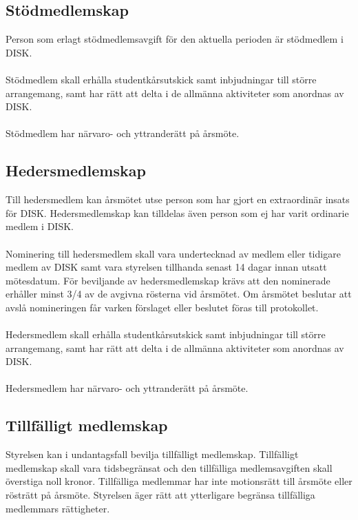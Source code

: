 	\subsection{Stödmedlemskap}
	\label{subsec:stodmedlemskap}
		Person som erlagt stödmedlemsavgift för den aktuella perioden är stödmedlem i DISK.\\ \\
		Stödmedlem skall erhålla studentkårsutskick samt inbjudningar till större arrangemang, samt har rätt att delta i de allmänna aktiviteter som anordnas av DISK.\\ \\
		Stödmedlem har närvaro- och yttranderätt på årsmöte.
\vfill
	\subsection{Hedersmedlemskap}
	\label{subsec:hedersmedlemskap}
		Till hedersmedlem kan årsmötet utse person som har gjort en extraordinär insats för DISK. Hedersmedlemskap kan tilldelas även person som ej har varit ordinarie medlem i DISK.\\ \\
Nominering till hedersmedlem skall vara undertecknad av medlem eller tidigare medlem av DISK samt vara styrelsen tillhanda senast 14 dagar innan utsatt mötesdatum. För beviljande av hedersmedlemskap krävs att den nominerade erhåller minst 3/4 av de avgivna rösterna vid årsmötet. Om årsmötet beslutar att avslå nomineringen får varken förslaget eller beslutet föras till protokollet.\\ \\
		Hedersmedlem skall erhålla studentkårsutskick samt inbjudningar till större arrangemang, samt har rätt att delta i de allmänna aktiviteter som anordnas av DISK.\\ \\
		Hedersmedlem har närvaro- och yttranderätt på årsmöte.

	\subsection{Tillfälligt medlemskap}
	\label{subsec:tillfalligtmedlemskap}
		Styrelsen kan i undantagsfall bevilja tillfälligt medlemskap. Tillfälligt medlemskap skall vara tidsbegränsat och den tillfälliga medlemsavgiften skall överstiga noll kronor. Tillfälliga medlemmar har inte motionsrätt till årsmöte eller rösträtt på årsmöte. Styrelsen äger rätt att ytterligare begränsa tillfälliga medlemmars rättigheter.

